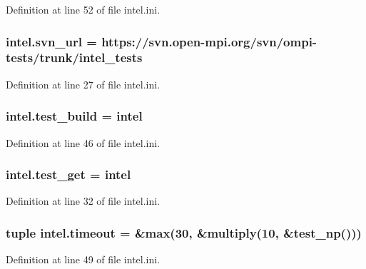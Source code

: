 Definition at line 52 of file intel.\-ini.

\hypertarget{namespaceintel_a8d07e9dc296f8c50b9c97df6aaeb9093}{
\subsubsection[{svn\-\_\-url}]{\setlength{\rightskip}{0pt plus 5cm}intel.\-svn\-\_\-url = https\-://svn.\-open-\/mpi.\-org/svn/ompi-\/tests/trunk/intel\-\_\-tests}}\label{namespaceintel_a8d07e9dc296f8c50b9c97df6aaeb9093}


Definition at line 27 of file intel.\-ini.

\hypertarget{namespaceintel_ae8bf5f8888540acb407bf95e166dcfc6}{
\subsubsection[{test\-\_\-build}]{\setlength{\rightskip}{0pt plus 5cm}intel.\-test\-\_\-build = intel}}\label{namespaceintel_ae8bf5f8888540acb407bf95e166dcfc6}


Definition at line 46 of file intel.\-ini.

\hypertarget{namespaceintel_a63ac10a6acb63df6cfdeeb2bfebcdf53}{
\subsubsection[{test\-\_\-get}]{\setlength{\rightskip}{0pt plus 5cm}intel.\-test\-\_\-get = intel}}\label{namespaceintel_a63ac10a6acb63df6cfdeeb2bfebcdf53}


Definition at line 32 of file intel.\-ini.

\hypertarget{namespaceintel_aeda6c693f850472a86267c93f7665d47}{
\subsubsection[{timeout}]{\setlength{\rightskip}{0pt plus 5cm}tuple intel.\-timeout = \&max(30, \&multiply(10, \&test\-\_\-np()))}}\label{namespaceintel_aeda6c693f850472a86267c93f7665d47}


Definition at line 49 of file intel.\-ini.

